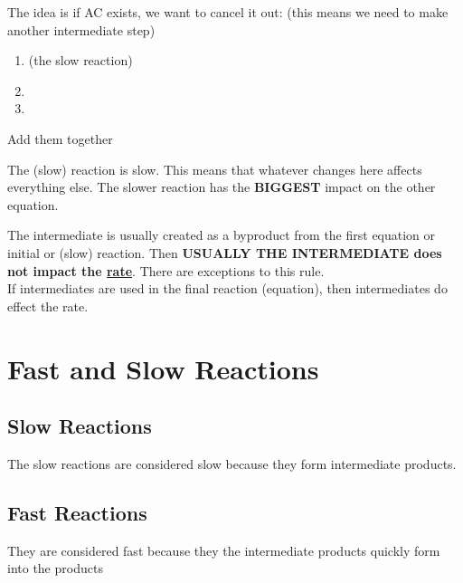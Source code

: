 \documentclass{article}
\begin{document}
The idea is if AC exists, we want to cancel it out: (this means we need to make another intermediate step)

\begin{enumerate}
\item {} (the slow reaction)
\item {} 
\item {}
\end{enumerate}
Add them together\\

The (slow) reaction is slow. This means that whatever changes here affects everything else. The slower reaction has the \textbf{BIGGEST} impact on the other equation. 

The intermediate is usually created as a byproduct from the first equation or initial or (slow) reaction. Then \textbf{USUALLY THE INTERMEDIATE does not impact the \underline{rate}}. There are exceptions to this rule.\\
If intermediates are used in the final reaction (equation), then intermediates do effect the rate.


\section{Fast and Slow Reactions}
\subsection{Slow Reactions}
The slow reactions are considered slow because they form intermediate products. 
\subsection{Fast Reactions}
They are considered fast because they the intermediate products quickly form into the products
\end{document}

